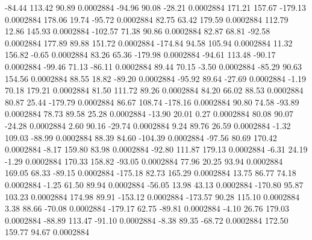       -84.44      113.42       90.89     0.0002884
      -94.96       90.08      -28.21     0.0002884
      171.21      157.67     -179.13     0.0002884
      178.06       19.74      -95.72     0.0002884
       82.75       63.42      179.59     0.0002884
      112.79       12.86      145.93     0.0002884
     -102.57       71.38       90.86     0.0002884
       82.87       68.81      -92.58     0.0002884
      177.89       89.88      151.72     0.0002884
     -174.84       94.58      105.94     0.0002884
       11.32      156.82       -0.65     0.0002884
       83.26       65.36     -179.98     0.0002884
      -94.61      113.48      -90.17     0.0002884
      -99.46       71.13      -86.11     0.0002884
       89.44       70.15       -3.50     0.0002884
      -85.29       90.63      154.56     0.0002884
       88.55       18.82      -89.20     0.0002884
      -95.92       89.64      -27.69     0.0002884
       -1.19       70.18      179.21     0.0002884
       81.50      111.72       89.26     0.0002884
       84.20       66.02       88.53     0.0002884
       80.87       25.44     -179.79     0.0002884
       86.67      108.74     -178.16     0.0002884
       90.80       74.58      -93.89     0.0002884
       78.73       89.58       25.28     0.0002884
      -13.90       20.01        0.27     0.0002884
       80.08       90.07      -24.28     0.0002884
        2.60       90.16      -29.74     0.0002884
        9.24       89.76       26.59     0.0002884
       -1.32      109.03      -88.99     0.0002884
       88.39       84.60     -104.39     0.0002884
      -97.56       80.69      170.42     0.0002884
       -8.17      159.80       83.98     0.0002884
      -92.80      111.87      179.13     0.0002884
       -6.31       24.19       -1.29     0.0002884
      170.33      158.82      -93.05     0.0002884
       77.96       20.25       93.94     0.0002884
      169.05       68.33      -89.15     0.0002884
     -175.18       82.73      165.29     0.0002884
       13.75       86.77       74.18     0.0002884
       -1.25       61.50       89.94     0.0002884
      -56.05       13.98       43.13     0.0002884
     -170.80       95.87      103.23     0.0002884
      174.98       89.91     -153.12     0.0002884
     -173.57       90.28      115.10     0.0002884
        3.38       88.66      -70.08     0.0002884
     -179.17       62.75      -89.81     0.0002884
       -4.10       26.76      179.03     0.0002884
      -88.89      113.47      -91.10     0.0002884
       -8.38       89.35      -68.72     0.0002884
      172.50      159.77       94.67     0.0002884
